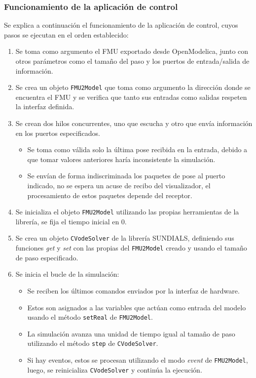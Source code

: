 \subsubsection{Funcionamiento de la aplicación de control}
Se explica a continuación el funcionamiento de la aplicación de control, cuyos pasos se ejecutan en el orden establecido:
\begin{enumerate}
	\item Se toma como argumento el FMU exportado desde OpenModelica, junto con otros parámetros como el tamaño del paso y los puertos de entrada/salida de información.
	\item Se crea un objeto \verb|FMU2Model| que toma como argumento la dirección donde se encuentra el FMU y se verifica que tanto sus entradas como salidas respeten la interfaz definida.
	\item Se crean dos hilos concurrentes, uno que escucha y otro que envía información en los puertos especificados.
	\begin{itemize}
		\item Se toma como válida solo la última pose recibida en la entrada, debido a que tomar valores anteriores haría inconsistente la simulación.
		\item Se envían de forma indiscriminada los paquetes de pose al puerto indicado, no se espera un acuse de recibo del visualizador, el procesamiento de estos paquetes depende del receptor.
	\end{itemize}
	\item Se inicializa el objeto \verb|FMU2Model| utilizando las propias herramientas de la librería, se fija el tiempo inicial en 0.
	\item Se crea un objeto \verb|CVodeSolver| de la librería SUNDIALS, definiendo sus funciones \textit{get} y \textit{set} con las propias del \verb|FMU2Model| creado y usando el tamaño de paso especificado.
	\item Se inicia el bucle de la simulación:
		\begin{itemize}
			\item Se reciben los últimos comandos enviados por la interfaz de hardware.
			\item Estos son asignados a las variables que actúan como entrada del modelo usando el método \verb|setReal| de \verb|FMU2Model|.
			\item La simulación avanza una unidad de tiempo igual al tamaño de paso utilizando el método \verb|step| de \verb|CVodeSolver|.
			\item Si hay eventos, estos se procesan utilizando el modo \textit{event} de \verb|FMU2Model|, luego, se reinicializa \verb|CVodeSolver| y continúa la ejecución.

\end{itemize}
\end{enumerate}
